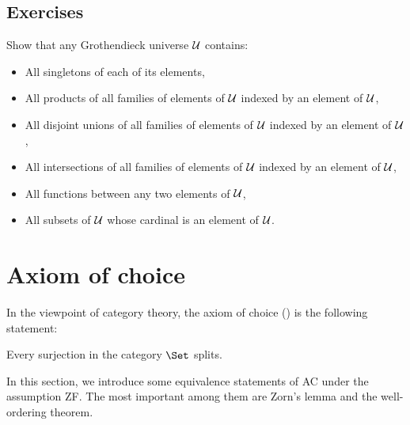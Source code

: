 \subsection{Exercises}
\begin{ex}
  Show that any Grothendieck universe ${\cal U}$ contains:
  \begin{itemize}
    \item All singletons of each of its elements,
    \item All products of all families of elements of ${\cal U}$ indexed by an element of ${\cal U}$,
    \item All disjoint unions of all families of elements of ${\cal U}$ indexed by an element of ${\cal U}$,
    \item All intersections of all families of elements of ${\cal U}$ indexed by an element of ${\cal U}$,
    \item All functions between any two elements of ${\cal U}$,
    \item All subsets of ${\cal U}$ whose cardinal is an element of ${\cal U}$.
  \end{itemize}
\end{ex}


\newpage\section{Axiom of choice}
  In the viewpoint of category theory, the axiom of choice () is the following statement:
  \begin{axiom}[AC]
    Every surjection in the category $\Set$ splits.
  \end{axiom}

  In this section, we introduce some equivalence statements of AC under the assumption ZF. The most important among them are Zorn's lemma and the well-ordering theorem.


